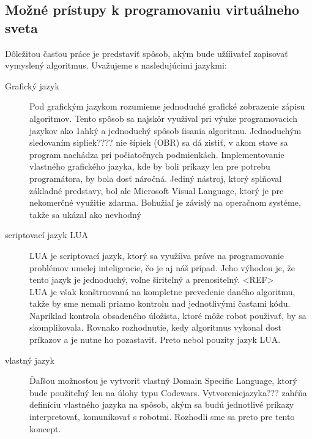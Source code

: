\subsection{Možné prístupy k programovaniu virtuálneho sveta}
Dôležitou časťou práce je predstaviť spôsob, akým bude užííivateľ zapisovať vymyslený algoritmus. Uvažujeme s nasledujúcimi jazykmi: %
\begin{description}
\item [Grafický jazyk] \hfill \newline
Pod grafickým jazykom rozumieme jednoduché grafické zobrazenie zápisu algoritmov. Tento spôsob sa najskôr využival pri výuke programovacich jazykov ako 1ahký a jednoduchý spôsob íisania algoritmu. Jednoduchým sledovaním sipliek????  nie šípiek (OBR) sa dá zistiť, v akom stave sa program nachádza pri počiatočnych podmienkách. 
Implementovanie vlastného grafického jazyka, kde by boli príkazy len pre potrebu programátora, by bola dosť náročná. Jediný nástroj, ktorý splňoval základné predstavy, bol ale Microsoft Visual Language, ktorý je pre nekomerčné využitie  zdarma. Bohužiaľ je závislý na operačnom systéme,  takže sa ukázal ako nevhodný \\ 
\item [scriptovací jazyk LUA]
LUA je scriptovací jazyk, ktorý sa využíiva práve na programovanie problémov umelej inteligencie, čo je aj náš prípad. Jeho výhodou je, že tento jazyk je jednoduchý, voľne širiteľný a prenositeľný.  <REF> \\
LUA je však konštruovaná na kompletne prevedenie daného algoritmu, takže by sme nemali priamo kontrolu nad jednotlivými časťami kódu. Napríklad kontrola obsadeného úložista, ktoré môže robot použivať, by sa skomplikovala. Rovnako rozhodnutie, kedy algoritmus vykonal dost príkazov a je nutne ho pozastaviť. Preto nebol pouzity jazyk LUA.
\item [vlastný jazyk]
Ďaľšou možnosťou je vytvoriť vlastný Domain Specific Language, ktorý bude použiteľný len na úlohy typu Codewars. Vytvoreniejazyka??? zahŕňa definíciu vlastného jazyka na spôsob, akým sa budú jednotlivé príkazy interpretovať, komunikovať s robotmi.
Rozhodli sme sa preto pre tento koncept.
\end{description} %
